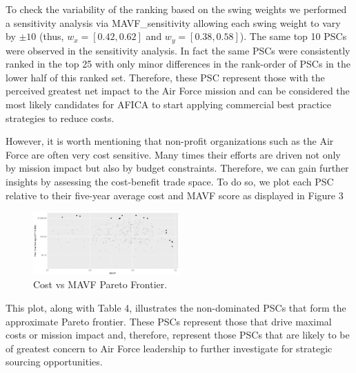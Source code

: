\documentclass[twocolumn]{svjour3}       %
\begin{document}
To check the variability of the ranking based on the swing weights we performed a sensitivity analysis via MAVF\_sensitivity allowing each swing weight to vary by $\pm 10$ (thus, $w_x = \left[0.42, 0.62\right]$ and $w_y = \left[0.38, 0.58\right]$).  The same top 10 PSCs were observed in the sensitivity analysis.  In fact the same PSCs were consistently ranked in the top 25 with only minor differences in the rank-order of PSCs in the lower half of this ranked set.  Therefore, these PSC represent those with the perceived greatest net impact to the Air Force mission and can be considered the most likely candidates for AFICA to start applying commercial best practice strategies to reduce costs.

However, it is worth mentioning that non-profit organizations such as the Air Force are often very cost sensitive.  Many times their efforts are driven not only by mission impact but also by budget constraints.  Therefore, we can gain further insights by assessing the cost-benefit trade space.   To do so, we plot each PSC relative to their five-year average cost and MAVF score as displayed in Figure 3 

\begin{figure}[!htb]
  \includegraphics[width=0.5\textwidth]{fig8.png}
  \caption{Cost vs MAVF Pareto Frontier.}
  \label{fig:8}
\end{figure}

This plot, along with Table 4, illustrates the non-dominated PSCs that form the approximate Pareto frontier.   These PSCs represent those that drive maximal costs or mission impact and, therefore, represent those PSCs that are likely to be of greatest concern to Air Force leadership to further investigate for strategic sourcing opportunities.
\end{document}
